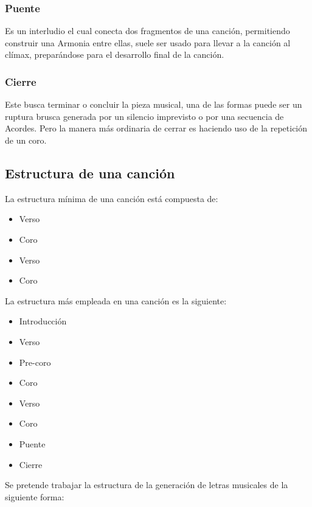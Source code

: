 \documentclass[12pt, a4paper, titlepage]{report}
\begin{document}
				\subsubsection*{Puente}\par
				Es un interludio el cual conecta dos fragmentos de una canción, permitiendo construir una \gls{Armonia} entre ellas, suele ser usado para llevar a la canción al clímax, preparándose para el desarrollo final de la canción.\par
				\subsubsection*{Cierre}\par
				Este busca terminar o concluir la pieza musical, una de las formas puede ser un ruptura brusca generada por un silencio imprevisto o por una secuencia de \gls{Acordes}. Pero la manera más ordinaria de cerrar es haciendo uso de la repetición de un coro.\par

			\newpage
			
			\subsection{Estructura de una canción}
			La estructura mínima de una canción está compuesta de:\par
			\begin{itemize}
			  \item Verso
			  \item Coro
			  \item Verso
			  \item Coro
			\end{itemize}\par
			La estructura más empleada en una canción es la siguiente:
			\begin{itemize}
			  \item Introducción
			  \item Verso
			  \item Pre-coro
			  \item Coro
			  \item Verso
			  \item Coro
			  \item Puente
			  \item Cierre
			\end{itemize}
		
			Se pretende trabajar la estructura de la generación de letras musicales de la siguiente forma:
			
\end{document}
